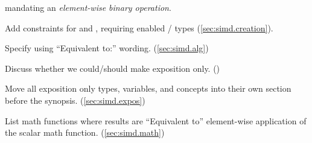 \begin{revision}
  mandating an \emph{element-wise binary operation}.
\item Add constraints for  and , requiring
  enabled / types
  (\ref{sec:simd.creation}).
\item Specify  using “Equivalent to:” wording.
  (\ref{sec:simd.alg})
\item Discuss whether we could/should make  exposition only.
  ()
\item Move all exposition only types, variables, and concepts into their own
  section before the synopsis. (\ref{sec:simd.expos})
\end{revision}

\begin{revision}
\item List math functions where results are “Equivalent to” element-wise application of the scalar math function. (\ref{sec:simd.math})

\end{revision}
